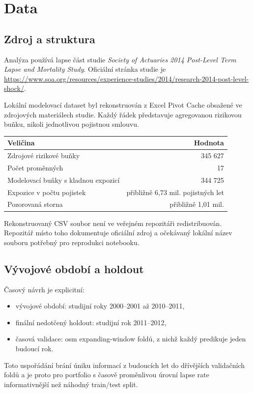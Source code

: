 \documentclass[11pt,a4paper]{article}
\theoremstyle{definition}
\begin{document}
\section{Data}
\subsection{Zdroj a struktura}
Analýza používá lapse část studie \textit{Society of Actuaries 2014 Post-Level Term Lapse and Mortality Study}. Oficiální stránka studie je \url{https://www.soa.org/resources/experience-studies/2014/research-2014-post-level-shock/}.

Lokální modelovací dataset byl rekonstruován z Excel Pivot Cache obsažené ve zdrojových materiálech studie. Každý řádek představuje agregovanou rizikovou buňku, nikoli jednotlivou pojistnou smlouvu.

\begin{center}
\begin{tabular}{lr}
\toprule
Veličina & Hodnota \\
\midrule
Zdrojové rizikové buňky & 345 627 \\
Počet proměnných & 17 \\
Modelovací buňky s kladnou expozicí & 344 725 \\
Expozice v počtu pojistek & přibližně 6,73 mil. pojistných let \\
Pozorovaná storna & přibližně 1,01 mil. \\
\bottomrule
\end{tabular}
\end{center}

Rekonstruovaný CSV soubor není ve veřejném repozitáři redistribuován. Repozitář místo toho dokumentuje oficiální zdroj a očekávaný lokální název souboru potřebný pro reprodukci notebooku.

\subsection{Vývojové období a holdout}
Časový návrh je explicitní:
\begin{itemize}
\item vývojové období: studijní roky 2000--2001 až 2010--2011,
\item finální nedotčený holdout: studijní rok 2011--2012,
\item časová validace: osm expanding-window foldů, z nichž každý predikuje jeden budoucí rok.
\end{itemize}

Toto uspořádání brání úniku informací z budoucích let do dřívějších validačních foldů a je proto pro portfolio s časově proměnlivou úrovní lapse rate informativnější než náhodný train/test split.
\end{document}
